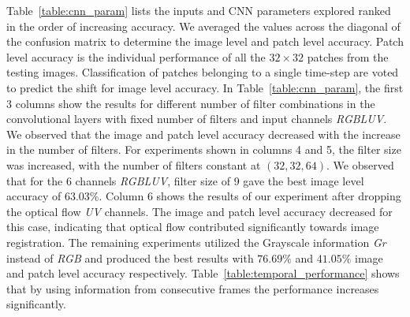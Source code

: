 \documentclass{article}
\begin{document}
Table~\ref{table:cnn_param} lists the inputs and CNN parameters explored ranked in the order of increasing accuracy. We averaged the values across the diagonal of the confusion matrix to determine the image level and patch level accuracy. Patch level accuracy is the individual performance of all the $32\times32$ patches from the testing images. Classification of patches belonging to a single time-step are voted to predict the shift for image level accuracy. In Table~\ref{table:cnn_param}, the first 3 columns show the results for different number of filter combinations in the convolutional layers with fixed number of filters and input channels \emph{RGBLUV}. We observed that the image  and patch level accuracy decreased with the increase in the number of filters. For experiments shown in columns 4 and 5, the filter size was increased, with the number of filters constant at $(32,32,64)$. We observed that for the 6 channels \emph{RGBLUV}, filter size of 9 gave the best image level accuracy of $63.03\%$. Column 6 shows the results of our experiment after dropping the optical flow \emph{UV} channels. The image and patch level accuracy decreased for this case, indicating that optical flow contributed significantly towards image registration. The remaining experiments utilized the Grayscale information \emph{Gr} instead of \emph{RGB} and produced the best results with $76.69\%$ and $41.05\%$ image and patch level accuracy respectively. Table~\ref{table:temporal_performance} shows that by using information from consecutive frames the performance increases significantly.





\end{document}
